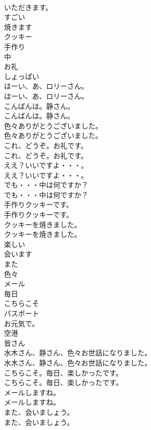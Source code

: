 \documentclass[8pt]{extreport}
\begin{document}
\begin{CJK}{UTF8}{min}
\\	いただきます。
\\	すごい
\\	焼きます
\\	クッキー
\\	手作り
\\	中
\\	お礼
\\	しょっぱい
\\	はーい、あ、ロリーさん。	
\\	はーい、あ、ロリーさん。 
\\	こんばんは。静さん。	
\\	こんばんは。静さん。 
\\	色々ありがとうございました。	
\\	色々ありがとうございました。 
\\	これ、どうぞ。お礼です。	
\\	これ、どうぞ。お礼です。 
\\	ええ？いいですよ・・・。	
\\	ええ？いいですよ・・・。 
\\	でも・・・中は何ですか？	
\\	でも・・・中は何ですか？ 
\\	手作りクッキーです。	
\\	手作りクッキーです。 
\\	クッキーを焼きました。	
\\	クッキーを焼きました。 
\\	楽しい
\\	会います
\\	また
\\	色々
\\	メール
\\	毎日
\\	こちらこそ
\\	パスポート
\\	お元気で。
\\	空港
\\	皆さん
\\	水木さん、静さん、色々お世話になりました。	
\\	水木さん、静さん、色々お世話になりました。 
\\	こちらこそ。毎日、楽しかったです。	
\\	こちらこそ。毎日、楽しかったです。 
\\	メールしますね。	
\\	メールしますね。 
\\	また、会いましょう。	
\\	また、会いましょう。 

\end{CJK}
\end{document}
